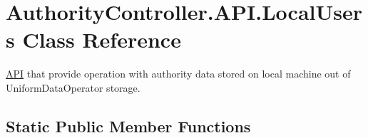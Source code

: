 \hypertarget{class_authority_controller_1_1_a_p_i_1_1_local_users}{}\section{Authority\+Controller.\+A\+P\+I.\+Local\+Users Class Reference}
\label{class_authority_controller_1_1_a_p_i_1_1_local_users}


\mbox{\hyperlink{namespace_authority_controller_1_1_a_p_i}{A\+PI}} that provide operation with authority data stored on local machine out of Uniform\+Data\+Operator storage.  


\subsection*{Static Public Member Functions}
